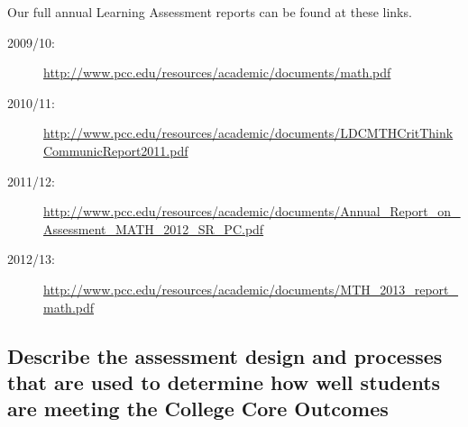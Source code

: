 Our full annual Learning Assessment reports can be found at these links. 
\begin{description}
\item[2009/10:] \url{http://www.pcc.edu/resources/academic/documents/math.pdf}
\item[2010/11:] \url{http://www.pcc.edu/resources/academic/documents/LDCMTHCritThinkCommunicReport2011.pdf}
\item[2011/12:] \url{http://www.pcc.edu/resources/academic/documents/Annual_Report_on_Assessment_MATH_2012_SR_PC.pdf}
\item[2012/13:] \url{http://www.pcc.edu/resources/academic/documents/MTH_2013_report_math.pdf}
\end{description}

\subsection{Describe the assessment design and processes that are used to
determine how well students are meeting the College Core Outcomes}

